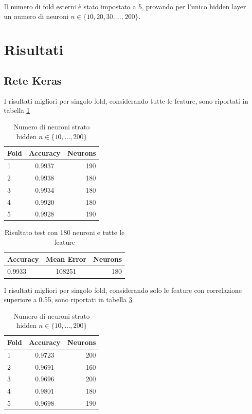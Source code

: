 \documentclass[12pt]{report}
\begin{document}
Il numero di fold esterni è stato impostato a 5, provando per l'unico hidden layer un numero di neuroni $n \in \{10, 20, 30, \dots, 200\}$.

\section{Risultati}

\subsection{Rete Keras}

I risultati migliori per singolo fold, considerando tutte le feature, sono riportati in tabella \ref{keras_all} 

\begin{table}[H]
\begin{center}
\begin{tabular}{lcr}
\toprule
Fold & Accuracy & Neurons \\
\midrule
1 & 0.9937 & 190\\
2 & 0.9938 & 180\\
3 & 0.9934 & 180\\
4 & 0.9920 & 180\\
5 & 0.9928 & 190\\
\bottomrule
\end{tabular}
\end{center}
\caption{Numero di neuroni strato hidden $n \in \{10, \dots, 200 \}$}
\label{keras_all}
\end{table}

\begin{table}[H]
\begin{center}
\begin{tabular}{lcr}
\toprule
Accuracy & Mean Error & Neurons \\
\midrule
0.9933 & 108251 & 180\\
\bottomrule
\end{tabular}
\end{center}
\caption{Risultato test con 180 neuroni e tutte le feature}
\label{keras_all_test}
\end{table}

\newpage

I risultati migliori per singolo fold, considerando solo le feature con correlazione superiore a 0.55, sono riportati in tabella \ref{keras_corr}

\begin{table}[H]
\begin{center}
\begin{tabular}{lcr}
\toprule
Fold & Accuracy & Neurons \\
\midrule
1  & 0.9723 & 200\\
2  & 0.9691 & 160\\
3  & 0.9696 & 200\\
4  & 0.9801 & 180\\
5  & 0.9698 & 190\\
\bottomrule
\end{tabular}
\end{center}
\caption{Numero di neuroni strato hidden $n \in \{10, \dots, 200 \}$}
\label{keras_corr}
\end{table}
\end{document}
